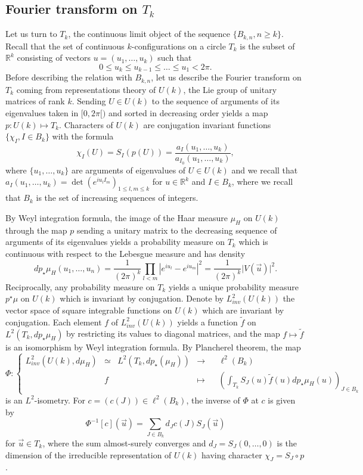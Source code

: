 \documentclass[10pt,11pt]{amsart}%
\begin{document}
\subsection{Fourier transform on $ T_{k}$}\label{Sec:Fourier_continuous}
Let us turn to $T_{k}$, the continuous limit object of the sequence $\{B_{k,n}, n\geq k\}$. Recall that the set of continuous $k$-configurations on a circle $ T_{k}$ is the subset of $\mathbb{R}^k$ consisting of vectors $u=(u_1,\ldots,u_k)$ such that 
$$0\leq u_k\leq u_{k-1}\leq \dots\leq u_1<2\pi.$$
Before describing the relation with $B_{k,n}$, let us describe the Fourier transform on $ T_{k}$ coming from representations theory of $U(k)$, the Lie group of unitary matrices of rank $k$. Sending $U\in U(k)$ to the sequence of arguments of its eigenvalues taken in $[0,2\pi[)$ and sorted in decreasing order yields a map $p:U(k)\mapsto  T_{k}$. Characters of $U(k)$ are conjugation invariant functions $\{\chi_I, I\in B_{k}\}$ with the formula 
\begin{equation}\label{eq:character_Uk}
\chi_I(U)=S_{I}(p(U))=\frac{a_{I}(u_1,\ldots,u_k)}{a_{I_0}(u_1,\ldots,u_k)},
\end{equation}
where $\{u_1,\ldots,u_k\}$ are arguments of eigenvalues of $U\in U(k)$ and we recall that $a_{I}(u_1,\ldots,u_k)=\det(e^{iu_lI_m})_{1\leq l,m\leq k}$ for $u\in\mathbb{R}^k$ and $I\in B_{k}$, where we recall that $B_k$ is the set of increasing sequences of integers.

 By Weyl integration formula, the image of the Haar measure $\mu_H$ on $U(k)$ through the map $p$ sending a unitary matrix to the decreasing sequence of arguments of its eigenvalues yields a probability measure on $ T_{k}$ which is continuous with respect to the Lebesgue measure and has density
$$dp_{\star}\mu_H(u_1,\ldots,u_n)=\frac{1}{(2\pi)^k}\prod_{l<m}\left\vert e^{iu_l}-e^{iu_m}\right\vert^2=\frac{1}{(2\pi)^k}\vert V(\vec{u})\vert^2.$$
Reciprocally, any probability measure on $ T_{k}$ yields a unique probability measure $p^{\star}\mu$ on $U(k)$ which is invariant by conjugation. Denote by $L^2_{inv}(U(k))$ the vector space of square integrable functions on $U(k)$ which are invariant by conjugation. Each element $f$ of $L^2_{inv}(U(k))$ yields a function $\tilde{f}$ on $L^2( T_{k},dp_{\star}\mu_H)$ by restricting its values to diagonal matrices, and the map $f\mapsto \tilde{f}$ is an isomorphism by Weyl integration formula. By Plancherel theorem, the map
$$\Phi:\left\lbrace\begin{aligned} L^2_{inv}(U(k),d\mu_H)&\simeq &L^2( T_{k},dp_{\star}(\mu_H)) &\rightarrow &&\ell^2(B_{k})\\
&f&&\mapsto&&\left(\int_{ T_{k}}S_{J}(u)\tilde{f}(u)dp_{\star}\mu_H(u)\right)_{J\in B_{k}}\end{aligned}\right.$$
is an $L^2$-isometry. For $c=(c(J))\in \ell^2(B_{k})$, the inverse of $\Phi$ at $c$ is given by 
$$\Phi^{-1}[c](\vec{u})=\sum_{J\in B_{k}}d_{J}c(J)S_J(\vec{u})$$
for $\vec{u}\in  T_{k}$, where the sum almost-surely converges and $d_J=S_J(0,\ldots,0)$ is the dimension of the irreducible representation of $U(k)$ having character $\chi_J=S_J\circ p$.
\end{document}

